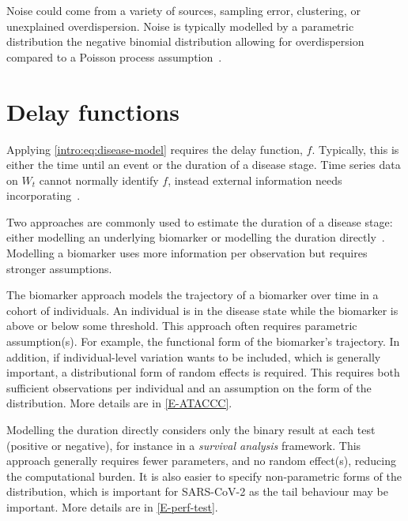 \documentclass[thesis.tex]{subfiles}
\begin{document}
Noise could come from a variety of sources, \eg sampling error, clustering, or unexplained overdispersion.
Noise is typically modelled by a parametric distribution \eg the negative binomial distribution allowing for overdispersion compared to a Poisson process assumption~\autocite[e.g.][]{birrellRealtimea,frassoBayesian}.

\section{Delay functions}

Applying \cref{intro:eq:disease-model} requires the delay function, $f$.
Typically, this is either the time until an event or the duration of a disease stage.
Time series data on $W_t$ cannot normally identify $f$, instead external information needs incorporating~\autocite{swallow2022challenges}.

Two approaches are commonly used to estimate the duration of a disease stage: either modelling an underlying biomarker or modelling the duration directly~\autocite[e.g.][]{sweetingEstimating}.
Modelling a biomarker uses more information per observation but requires stronger assumptions.

The biomarker approach models the trajectory of a biomarker over time in a cohort of individuals.
An individual is in the disease state while the biomarker is above or below some threshold.
This approach often requires parametric assumption(s).
For example, the functional form of the biomarker's trajectory.
In addition, if individual-level variation wants to be included, which is generally important, a distributional form of random effects is required.
This requires both sufficient observations per individual and an assumption on the form of the distribution.
More details are in \cref{E-ATACCC}.

Modelling the duration directly considers only the binary result at each test (positive or negative), for instance in a \emph{survival analysis} framework.
This approach generally requires fewer parameters, and no random effect(s), reducing the computational burden.
It is also easier to specify non-parametric forms of the distribution, which is important for SARS-CoV-2 as the tail behaviour may be important.
More details are in \cref{E-perf-test}.
\end{document}

